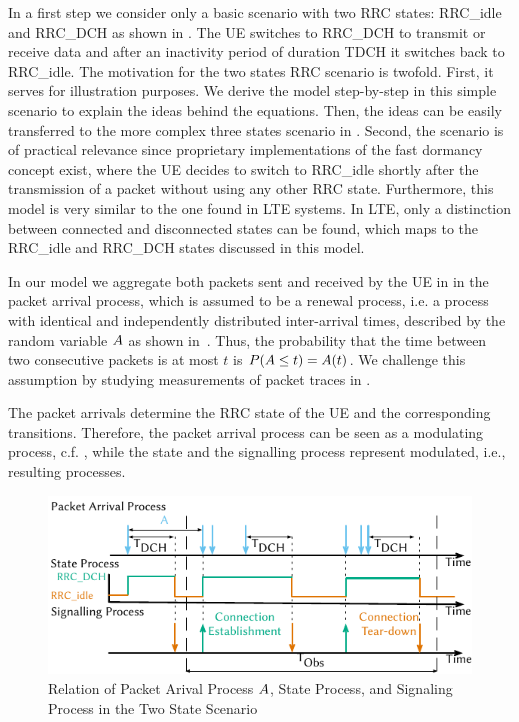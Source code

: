 In a first step we consider only a basic scenario with two \gls{RRC} states: \gls{RRC_idle} and \gls{RRC_DCH} as shown in .
The \gls{UE} switches to \gls{RRC_DCH} to transmit or receive data and after an inactivity period of duration \gls{TDCH} it switches back to \gls{RRC_idle}. 
The motivation for the two states \gls{RRC} scenario is twofold.
First, it serves for illustration purposes.
We derive the model step-by-step in this simple scenario to explain the ideas behind the equations.
Then, the ideas can be easily transferred to the more complex three states scenario in .
Second, the scenario is of practical relevance since proprietary implementations of the fast dormancy concept \cite{NSN2011} exist, where the \gls{UE} decides to switch to \gls{RRC_idle} shortly after the transmission of a packet without using any other \gls{RRC} state.
Furthermore, this model is very similar to the one found in \gls{LTE} systems.
In \gls{LTE}, only a distinction between connected and disconnected states can be found, which maps to the \gls{RRC_idle} and \gls{RRC_DCH} states discussed in this model.

In our model we aggregate both packets sent and received by the \gls{UE} in in the packet arrival process, which is assumed to be a renewal process, i.e. a process  with identical and independently distributed inter-arrival times, described by the random variable \(A\) as shown in~.
Thus, the probability that the time between two consecutive packets is at most \(t\) is \(P(A \leq t) = A(t)\).
We challenge this assumption by studying measurements of packet traces in .

The packet arrivals determine the \gls{RRC} state of the \gls{UE} and the corresponding transitions. Therefore, the packet arrival process can be seen as a modulating process, c.f. \cite{TranGia1983,TranGia1988}, while the state and the signalling process represent modulated, i.e., resulting processes.

\begin{figure}
  \centering
  \includegraphics{network/performance_model/analytical_model/figures/arrival_process}
  \caption{Relation of Packet Arival Process \(A\), State Process, and Signaling Process in the Two State Scenario}
  \label{fig:network:performance_model:system_description:arrival_process}
\end{figure}

